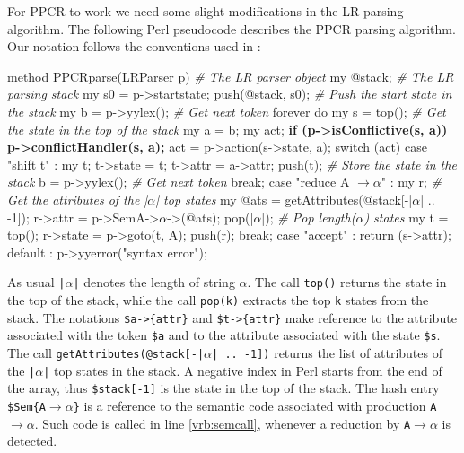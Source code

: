 \label{alg:parser}       
For PPCR to work we need some slight modifications in the LR parsing algorithm.
The following Perl pseudocode describes the PPCR parsing algorithm. 
Our notation follows the conventions 
used in \cite{aho2006}:

\begin{VERBATIM}[codes={\catcode`$=3\catcode`\_=8\catcode`^=7}]
method PPCRparse(LRParser \Dr{}p)          \textit{# The LR parser object}
 my @stack;                            \textit{# The LR parsing stack}
 my \Dr{}s0 = \Dr{}p->startstate;
 push(@stack, \Dr{}s0);       \textit{# Push the start state in the stack}
 my \Dr{}b = \Dr{}p->yylex();                        \textit{# Get next token}
 forever do \B{}
   my \Dr{}s = top();     \textit{# Get the state in the top of the stack}
   my \Dr{}a = \Dr{}b;
   my \Dr{}act; 
   \textbf{if (\Dr{}p->isConflictive(\Dr{}s, \Dr{}a)) \Dr{}p->conflictHandler(\Dr{}s, \Dr{}a); } \label{vrb:conflictbegin}
   \Dr{}act = \Dr{}p->action(\Dr{}s->state, \Dr{}a);  \label{vrb:action}
   switch (\Dr{}act) \B{}
     case "shift t" : 
       my \Dr{}t;
       \Dr{}t->\B{}state\BB{} = t;
       \Dr{}t->\B{}attr\BB{}  = \Dr{}a->\B{}attr\BB{};
       push(\Dr{}t);               \textit{# Store the state in the stack}
       \Dr{}b = \Dr{}p->yylex();                     \textit{# Get next token}
       break;
     case "reduce A $\rightarrow \alpha$" : 
       my \Dr{}r;
                   \textit{# Get the attributes of the |$\alpha$| top states}
       my @ats = getAttributes(@stack[-|$\alpha$| .. -1]); 
       \Dr{}r->\B{}attr\BB{} = \Dr{}p->Sem\B{}A->$\alpha$\BB{}->(@ats); \label{vrb:semcall}
       pop(|$\alpha$|);                       \textit{# Pop length($\alpha$) states}
       my \Dr{}t = top();
       \Dr{}r->\B{}state\BB{} = \Dr{}p->goto(\Dr{}t, A); \label{vrb:goto}
       push(\Dr{}r); 
       break;
     case "accept" : return (\Dr{}s->attr); 
     default : \Dr{}p->yyerror("syntax error");
   \BB{}
\end{VERBATIM}

As usual \verb#|#$\alpha$\verb#|# denotes the length of string $\alpha$.
The call \verb|top()| returns the state in the top of the stack,
while the call \verb|pop(k)| extracts the top \verb|k| states from the stack.
The notations \verb|$a->{attr}| and \verb|$t->{attr}| make reference to the
attribute associated with the token  \verb|$a| and to the attribute associated with the state 
\verb|$s|.
The call \verb#getAttributes(@stack[-|#$\alpha$\verb#| .. -1])# returns the list of attributes
of the \verb#|#$\alpha$\verb#|#  top states in the stack. A negative index in Perl starts
from the end of the array, thus \verb|$stack[-1]| is the state in the top of the stack.
The hash entry \verb|$Sem{A|$\rightarrow \alpha$\verb|}| is a reference to the semantic code 
associated with production \verb|A|$\rightarrow \alpha$. 
Such code is called in line \ref{vrb:semcall},
whenever a reduction by \verb|A|$\rightarrow \alpha$ is detected. 


